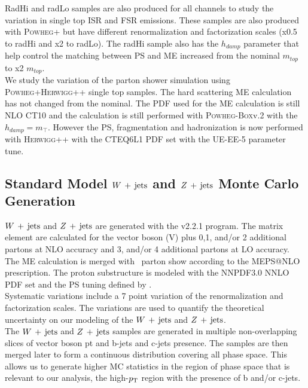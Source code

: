 \indent RadHi and radLo samples are also produced for all channels to study the variation in single top ISR and FSR emissions.  These samples are also produced with \textsc{Powheg+} but have different renormalization and factorization scales (x0.5 to radHi and x2 to radLo). The radHi sample also has the $h_{damp}$ parameter that help control the matching between PS and ME increased from the nominal $m_{top}$ to x2 $m_{top}$. \\

\indent We study the variation of the parton shower simulation using \textsc{Powheg+Herwigg++} single top samples.  The hard scattering ME calculation has not changed from the nominal.  The PDF used for the ME calculation is still NLO CT10 and the calculation is still performed with \textsc{Powheg-Box}v.2 with the $h_{damp} = m_{\top}$.  However the PS, fragmentation and hadronization is now performed with \textsc{Herwigg++} with the CTEQ6L1 PDF set \cite{CTEQ6L1} with the UE-EE-5 parameter tune. \\

\subsection{Standard Model $W\,+\,\mathrm{jets}$ and $Z\,+\,\mathrm{jets}$ Monte Carlo Generation}

\indent $W\,+\,\mathrm{jets}$ and $Z\,+\,\mathrm{jets}$ are generated with the \sherpa v2.2.1 program.  The matrix element are calculated for the vector boson (V) plus 0,1, and/or 2 additional partons at NLO accuracy and 3, and/or 4 additional partons at LO accuracy.  \\

\indent The ME calculation is merged with \sherpa\ parton show according to the MEPS@NLO prescription.  The proton substructure is modeled with the NNPDF3.0 NNLO PDF set and the PS tuning defined by \sherpa.  \\

\indent  Systematic variations include a 7 point variation of the renormalization and factorization scales.  The variations are used to quantify the theoretical uncertainty on our modeling of the $W\,+\,\mathrm{jets}$ and $Z\,+\,\mathrm{jets}$. \\

\indent  The $W\,+\,\mathrm{jets}$ and $Z\,+\,\mathrm{jets}$ samples are generated in multiple non-overlapping slices of vector boson pt and b-jets and c-jets presence.  The samples are then merged later to form a continuous distribution covering all phase space.  This allows us to generate higher MC statistics in the region of phase space that is relevant to our analysis, the high-$p_{\mathrm{T}}$ region with the presence of b and/or c-jets. \\

